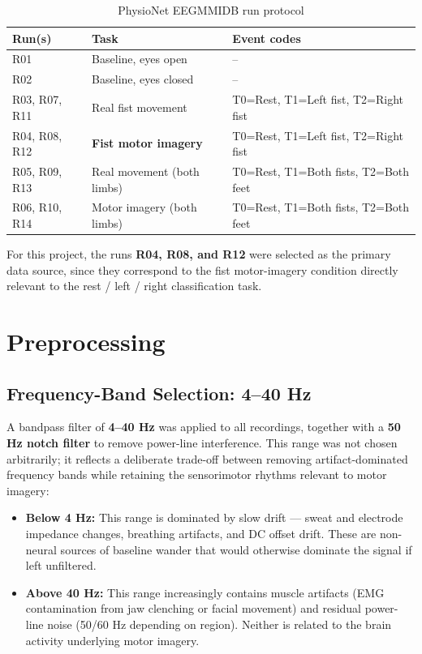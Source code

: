 \documentclass[11pt,a4paper]{article}
\begin{document}
\begin{table}[h!]
\centering
\caption{PhysioNet EEGMMIDB run protocol}
\label{tab:run-protocol}
\begin{tabular}{lll}
\toprule
\textbf{Run(s)} & \textbf{Task} & \textbf{Event codes} \\
\midrule
R01 & Baseline, eyes open & -- \\
R02 & Baseline, eyes closed & -- \\
R03, R07, R11 & Real fist movement & T0=Rest, T1=Left fist, T2=Right fist \\
R04, R08, R12 & \textbf{Fist motor imagery} & T0=Rest, T1=Left fist, T2=Right fist \\
R05, R09, R13 & Real movement (both limbs) & T0=Rest, T1=Both fists, T2=Both feet \\
R06, R10, R14 & Motor imagery (both limbs) & T0=Rest, T1=Both fists, T2=Both feet \\
\bottomrule
\end{tabular}
\end{table}

For this project, the runs \textbf{R04, R08, and R12} were selected as the primary data source, since they correspond to the fist motor-imagery condition directly relevant to the rest / left / right classification task.

\section{Preprocessing}

\subsection{Frequency-Band Selection: 4--40 Hz}
A bandpass filter of \textbf{4--40 Hz} was applied to all recordings, together with a \textbf{50 Hz notch filter} to remove power-line interference. This range was not chosen arbitrarily; it reflects a deliberate trade-off between removing artifact-dominated frequency bands while retaining the sensorimotor rhythms relevant to motor imagery:

\begin{itemize}[leftmargin=1.5em]
    \item \textbf{Below 4 Hz:} This range is dominated by slow drift --- sweat and electrode impedance changes, breathing artifacts, and DC offset drift. These are non-neural sources of baseline wander that would otherwise dominate the signal if left unfiltered.
    \item \textbf{Above 40 Hz:} This range increasingly contains muscle artifacts (EMG contamination from jaw clenching or facial movement) and residual power-line noise (50/60 Hz depending on region). Neither is related to the brain activity underlying motor imagery.
\end{itemize}
\end{document}
